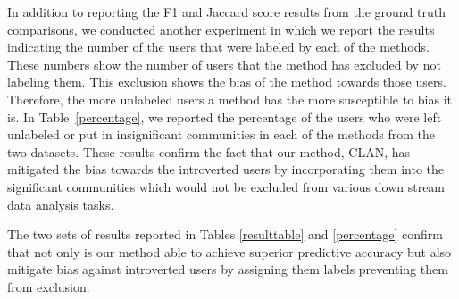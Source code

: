 In addition to reporting the F1 and Jaccard score results from the ground truth comparisons, we conducted another experiment in which we report the results indicating the number of the users that were labeled by each of the methods. %
These numbers show the number of users that the method has excluded by not labeling them. This exclusion shows the bias of the method towards those users. Therefore, the more unlabeled users a method has the more susceptible to bias it is. In Table~\ref{percentage}, %
we reported the percentage of the users who were left unlabeled or put in insignificant communities in each of the methods from the two datasets. These results confirm the fact that our method, CLAN, has mitigated the bias towards the introverted users by incorporating them into the significant communities which would not be excluded from various down stream data analysis tasks.

The two sets of results reported in Tables \ref{resulttable} and \ref{percentage} confirm that not only is our method able to achieve superior predictive accuracy but also mitigate bias against introverted users by assigning them labels preventing them from exclusion.
